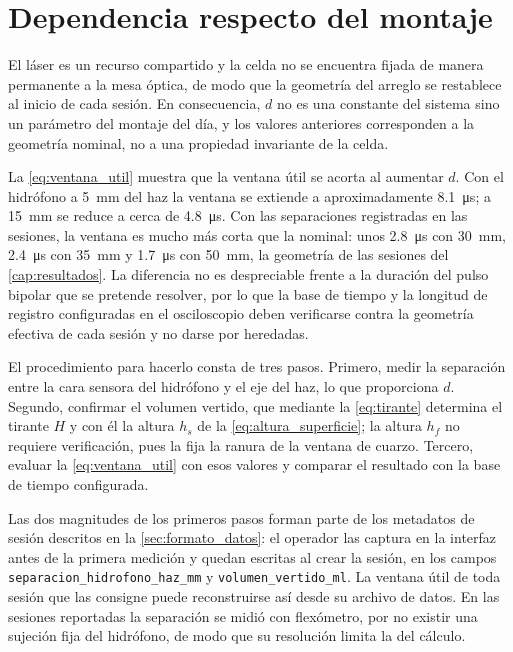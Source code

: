 \section*{Dependencia respecto del montaje}

El láser es un recurso compartido y la celda no se encuentra fijada de
manera permanente a la mesa óptica, de modo que la geometría del
arreglo se restablece al inicio de cada sesión. En consecuencia, $d$ no
es una constante del sistema sino un parámetro del montaje del día, y
los valores anteriores corresponden a la geometría nominal, no a una
propiedad invariante de la celda.

La \cref{eq:ventana_util} muestra que la ventana útil se acorta al
aumentar $d$. Con el hidrófono a \SI{5}{\milli\meter} del haz la
ventana se extiende a aproximadamente \SI{8.1}{\micro\second}; a
\SI{15}{\milli\meter} se reduce a cerca de \SI{4.8}{\micro\second}. Con
las separaciones registradas en las sesiones, la ventana es mucho más
corta que la nominal: unos \SI{2.8}{\micro\second} con
\SI{30}{\milli\meter}, \SI{2.4}{\micro\second} con
\SI{35}{\milli\meter} y \SI{1.7}{\micro\second} con
\SI{50}{\milli\meter}, la geometría de las sesiones del
\cref{cap:resultados}. La diferencia no es despreciable frente a la duración del pulso bipolar
que se pretende resolver, por lo que la base de tiempo y la longitud de
registro configuradas en el osciloscopio deben verificarse contra la
geometría efectiva de cada sesión y no darse por heredadas.

El procedimiento para hacerlo consta de tres pasos. Primero, medir la
separación entre la cara sensora del hidrófono y el eje del
haz, lo que proporciona $d$. Segundo, confirmar el volumen vertido, que
mediante la \cref{eq:tirante} determina el tirante $H$ y con él la
altura $h_s$ de la \cref{eq:altura_superficie}; la altura $h_f$ no
requiere verificación, pues la fija la ranura de la ventana de cuarzo.
Tercero, evaluar la \cref{eq:ventana_util} con esos valores y comparar
el resultado con la base de tiempo configurada.

Las dos magnitudes de los primeros pasos forman parte de los metadatos
de sesión descritos en la \cref{sec:formato_datos}: el operador las
captura en la interfaz antes de la primera medición y quedan escritas
al crear la sesión, en los campos
\texttt{separacion\_hidrofono\_haz\_mm} y
\texttt{volumen\_vertido\_ml}. La ventana útil de toda sesión que
las consigne puede reconstruirse así desde su archivo de datos. En las sesiones
reportadas la separación se midió con flexómetro, por no existir una
sujeción fija del hidrófono, de modo que su resolución limita la del
cálculo.
